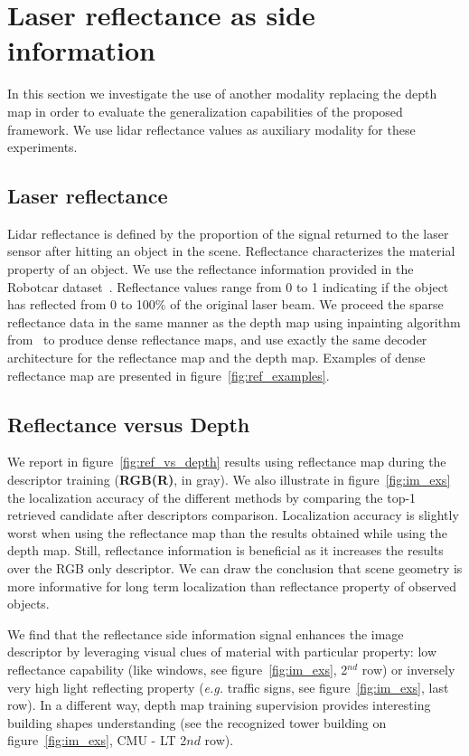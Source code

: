 \section{Laser reflectance as side information}

\label{sec:modality_ref}


In this section we investigate the use of another modality replacing the depth map in order to evaluate the generalization capabilities of the proposed framework. We use lidar reflectance values as auxiliary modality for these experiments.

\subsection{Laser reflectance}
Lidar reflectance is defined by the proportion of the signal returned to the laser sensor after hitting an object in the scene. Reflectance characterizes the material property of an object. We use the reflectance information provided in the Robotcar dataset~\cite{Maddern2016}. Reflectance values range from 0 to 1 indicating if the object has reflected from 0 to 100\% of the original laser beam. We proceed the sparse reflectance data in the same manner as the depth map using inpainting algorithm from~\cite{Bevilacqua2017} to produce dense reflectance maps, and use exactly the same decoder architecture for the reflectance map and the depth map. Examples of dense reflectance map are presented in figure~\ref{fig:ref_examples}.

\subsection{Reflectance versus Depth}
We report in figure~\ref{fig:ref_vs_depth} results using reflectance map during the descriptor training (\textbf{RGB(R)}, in gray). We also illustrate in figure~\ref{fig:im_exs} the localization accuracy of the different methods by comparing the top-1 retrieved candidate after descriptors comparison. Localization accuracy is slightly worst when using the reflectance map than the results obtained while using the depth map. Still, reflectance information is beneficial as it increases the results over the RGB only descriptor. We can draw the conclusion that scene geometry is more informative for long term localization than reflectance property of observed objects.

We find that the reflectance side information signal enhances the image descriptor by leveraging visual clues of material with particular property: low reflectance capability (like windows, see figure~\ref{fig:im_exs}, 2$^{nd}$ row) or inversely very high light reflecting property (\textit{e.g.} traffic signs, see figure~\ref{fig:im_exs}, last row). In a different way, depth map training supervision provides interesting building shapes understanding (see the recognized tower building on figure~\ref{fig:im_exs}, CMU - LT 2$nd$ row).

